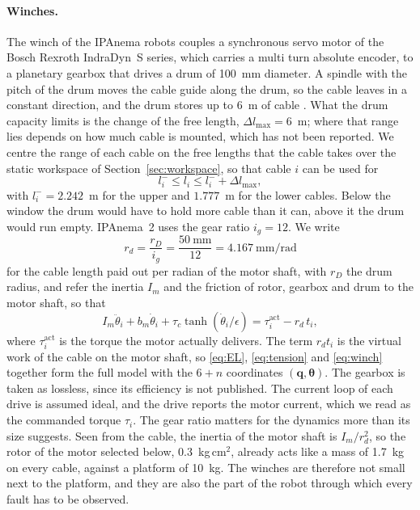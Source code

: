 \documentclass[10pt]{article}
\newcommand{\vc}[1]{\bm{#1}}
\begin{document}
\paragraph{Winches.} The winch of the IPAnema robots couples a synchronous servo motor of the Bosch Rexroth IndraDyn~S series, which carries a multi turn absolute encoder, to a planetary gearbox that drives a drum of 100~mm diameter. A spindle with the pitch of the drum moves the cable guide along the drum, so the cable leaves in a constant direction, and the drum stores up to 6~m of cable \citep{pott2013ipanema}. What the drum capacity limits is the change of the free length, $\Delta l_{\max}=6$~m; where that range lies depends on how much cable is mounted, which has not been reported. We centre the range of each cable on the free lengths that the cable takes over the static workspace of Section~\ref{sec:workspace}, so that cable $i$ can be used for
\begin{equation}\label{eq:window}
l_i^-\le l_i\le l_i^-+\Delta l_{\max},
\end{equation}
with $l_i^-=2.242$~m for the upper and $1.777$~m for the lower cables. Below the window the drum would have to hold more cable than it can, above it the drum would run empty. IPAnema~2 uses the gear ratio $i_g=12$. We write
\begin{equation}\label{eq:rd}
r_d=\frac{r_D}{i_g}=\frac{50~\text{mm}}{12}=4.167~\text{mm/rad}
\end{equation}
for the cable length paid out per radian of the motor shaft, with $r_D$ the drum radius, and refer the inertia $I_m$ and the friction of rotor, gearbox and drum to the motor shaft, so that
\begin{equation}\label{eq:winch}
I_m\ddot\theta_i+b_m\dot\theta_i+\tau_c\tanh(\dot\theta_i/\epsilon)=\tau_i^{\mathrm{act}}-r_d\,t_i ,
\end{equation}
where $\tau_i^{\mathrm{act}}$ is the torque the motor actually delivers. The term $r_d t_i$ is the virtual work of the cable on the motor shaft, so \eqref{eq:EL}, \eqref{eq:tension} and \eqref{eq:winch} together form the full model with the $6+n$ coordinates $(\vc q,\vc\theta)$. The gearbox is taken as lossless, since its efficiency is not published. The current loop of each drive is assumed ideal, and the drive reports the motor current, which we read as the commanded torque $\tau_i$. The gear ratio matters for the dynamics more than its size suggests. Seen from the cable, the inertia of the motor shaft is $I_m/r_d^2$, so the rotor of the motor selected below, 0.3~kg\,cm$^2$, already acts like a mass of 1.7~kg on every cable, against a platform of 10~kg. The winches are therefore not small next to the platform, and they are also the part of the robot through which every fault has to be observed.
\end{document}
